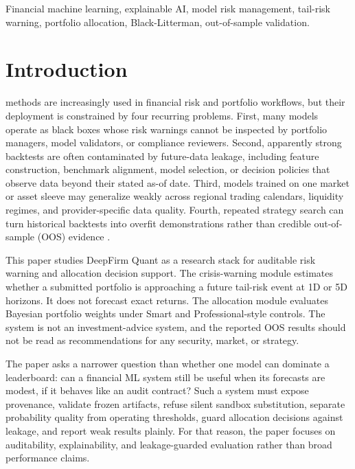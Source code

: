 \documentclass{ieeeaccess}
\begin{document}
\begin{keywords}
Financial machine learning, explainable AI, model risk management, tail-risk warning, portfolio allocation, Black-Litterman, out-of-sample validation.
\end{keywords}

\titlepgskip=-15pt
\maketitle

\section{Introduction}
\label{sec:introduction}
 methods are increasingly used in financial risk and portfolio workflows, but their deployment is constrained by four recurring problems. First, many models operate as black boxes whose risk warnings cannot be inspected by portfolio managers, model validators, or compliance reviewers. Second, apparently strong backtests are often contaminated by future-data leakage, including feature construction, benchmark alignment, model selection, or decision policies that observe data beyond their stated as-of date. Third, models trained on one market or asset sleeve may generalize weakly across regional trading calendars, liquidity regimes, and provider-specific data quality. Fourth, repeated strategy search can turn historical backtests into overfit demonstrations rather than credible out-of-sample (OOS) evidence \cite{White2000RealityCheck,BaileyEtAl2016BacktestOverfitting,BaileyLopezDePrado2014DeflatedSharpe,LopezDePrado2018FinancialML}.

This paper studies DeepFirm Quant as a research stack for auditable risk warning and allocation decision support. The crisis-warning module estimates whether a submitted portfolio is approaching a future tail-risk event at 1D or 5D horizons. It does not forecast exact returns. The allocation module evaluates Bayesian portfolio weights under Smart and Professional-style controls. The system is not an investment-advice system, and the reported OOS results should not be read as recommendations for any security, market, or strategy.

The paper asks a narrower question than whether one model can dominate a leaderboard: can a financial ML system still be useful when its forecasts are modest, if it behaves like an audit contract? Such a system must expose provenance, validate frozen artifacts, refuse silent sandbox substitution, separate probability quality from operating thresholds, guard allocation decisions against leakage, and report weak results plainly. For that reason, the paper focuses on auditability, explainability, and leakage-guarded evaluation rather than broad performance claims.
\end{document}

